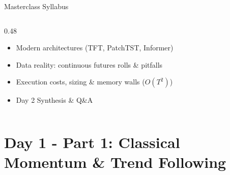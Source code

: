 \documentclass[10pt]{beamer}
\begin{document}
\begin{frame}{Masterclass Syllabus}
\begin{columns}[t]
\begin{column}{0.48\textwidth}
\begin{itemize}
        \begin{itemize}\tiny
          \item Modern architectures (TFT, PatchTST, Informer)
          \item Data reality: continuous futures rolls \& pitfalls
          \item Execution costs, sizing \& memory walls ($O(T^2)$)
          \item Day 2 Synthesis \& Q\&A
        \end{itemize}
      \end{itemize}
    \end{column}
  \end{columns}
\end{frame}

\section{Day 1 - Part 1: Classical Momentum \& Trend Following}
\end{document}
